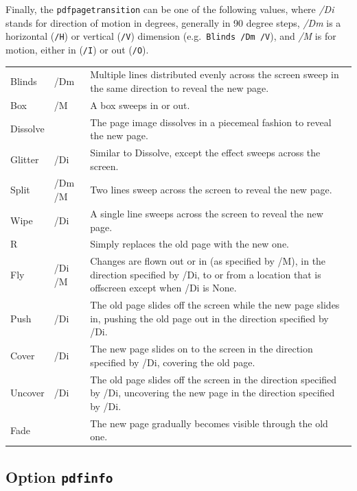\documentclass{article}
\begin{document}
Finally, the \texttt{pdfpagetransition} can be one of the following values,
where \textit{/Di} stands for direction of motion in degrees, generally in 90
degree steps, \textit{/Dm} is a horizontal (\texttt{/H}) or vertical
(\texttt{/V}) dimension (e.g.\ \texttt{Blinds /Dm /V}), and \textit{/M} is
for motion, either in (\texttt{/I}) or out (\texttt{/O}).

\begin{longtable}{@{}>{\ttfamily}llp{8.5cm}@{}}
Blinds   & /Dm    & Multiple lines distributed evenly across the screen sweep in the same direction to reveal the new
                    page. \\
Box      & /M     & A box sweeps in or out. \\
Dissolve &        & The page image dissolves in a piecemeal fashion to reveal the new page. \\
Glitter  & /Di    & Similar to Dissolve, except the effect sweeps across the screen. \\
Split    & /Dm /M & Two lines sweep across the screen to reveal the new page. \\
Wipe     & /Di    & A single line sweeps across the screen to reveal the new page. \\
R        &        & Simply replaces the old page with the new one. \\
Fly      & /Di /M & Changes are flown out or in (as specified by /M), in the direction
                    specified by /Di, to or from a location that is
                    offscreen except when /Di is None. \\
Push     & /Di    & The old page slides off the screen while the new page slides in,
                    pushing the old page out in the direction
                    specified by /Di. \\
Cover    & /Di    & The new page slides on to the screen in the direction specified
                    by /Di, covering the old page. \\
Uncover  & /Di    & The old page slides off the screen in the direction specified by
                    /Di, uncovering the new page in the direction
                    specified by /Di. \\
Fade     &        & The new page gradually becomes visible through the old one.

\end{longtable}

\subsection{Option \texttt{pdfinfo}}
\end{document}
